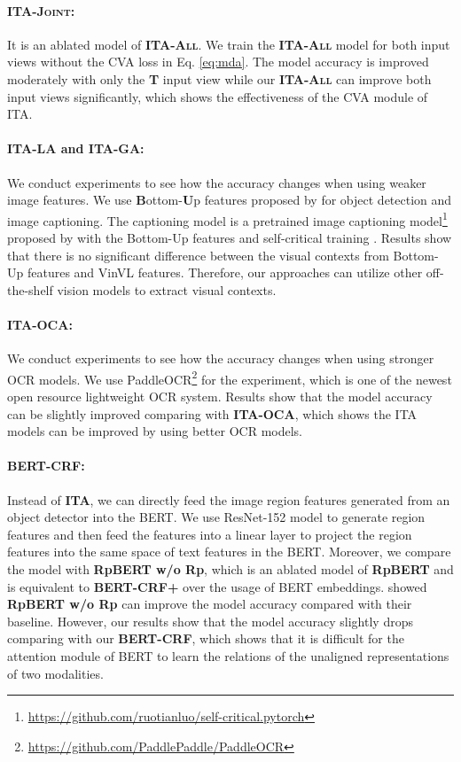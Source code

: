 \documentclass[11pt]{article}
\begin{document}
\paragraph{\textsc{\bf ITA-Joint}:} It is an ablated model of \textsc{\bf ITA-All}. We train the \textsc{\bf ITA-All} model for both input views without the CVA loss in Eq. \ref{eq:mda}. The model accuracy is improved moderately with only the \textbf{T} input view while our \textsc{\bf ITA-All} can improve both input views significantly, which shows the effectiveness of the CVA module of ITA.
\paragraph{\textsc{\bf ITA-LA} and \textsc{\bf ITA-GA}:} We conduct experiments to see how the accuracy changes when using weaker image features. We use \textbf{B}ottom-\textbf{U}p features proposed by \citet{Anderson2017up-down} for object detection and image captioning. The captioning model is a pretrained image captioning model\footnote{\url{https://github.com/ruotianluo/self-critical.pytorch}} proposed by \citet{Luo2018DiscriminabilityOF} with the Bottom-Up features and self-critical training \citep{rennie2017self}. Results show that there is no significant difference between the visual contexts from Bottom-Up features and VinVL features. Therefore, our approaches can utilize other off-the-shelf vision models to extract visual contexts.
\paragraph{\textsc{\bf ITA-OCA}:} We conduct experiments to see how the accuracy changes when using stronger OCR models. We use PaddleOCR\footnote{\url{https://github.com/PaddlePaddle/PaddleOCR}} for the experiment, which is one of the newest open resource lightweight OCR system. Results show that the model accuracy can be slightly improved comparing with \textsc{\bf ITA-OCA}, which shows the ITA models can be improved by using better OCR models.
\paragraph{{\textbf{BERT-CRF}}:} Instead of \textbf{ITA}, we can directly feed the image region features generated from an object detector into the BERT. We use ResNet-152 model to generate region features and then feed the features into a linear layer to project the region features into the same space of text features in the BERT. Moreover, we compare the model with {\textbf{RpBERT w/o Rp}}, which is an ablated model of {\textbf{RpBERT}} and is equivalent to {\textbf{BERT-CRF+}} over the usage of BERT embeddings. \citet{Sun2021RpBERTAT} showed {\textbf{RpBERT w/o Rp}} can improve the model accuracy compared with their baseline. However, our results show that the model accuracy slightly drops comparing with our {\textbf{BERT-CRF}}, which shows that it is difficult for the attention module of BERT to learn the relations of the unaligned representations of two modalities. 
\end{document}
